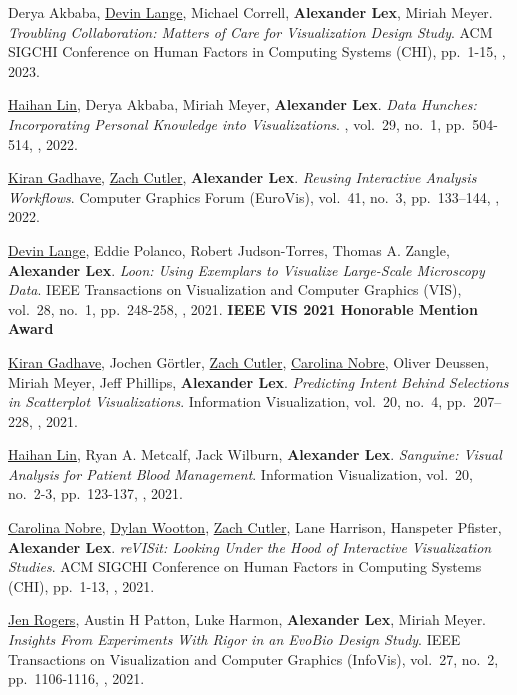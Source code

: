 \item Derya Akbaba, \uline{Devin Lange}, Michael Correll, \textbf{Alexander Lex}, Miriah Meyer. \textit{Troubling Collaboration: Matters of Care for Visualization Design Study}. ACM SIGCHI Conference on Human Factors in Computing Systems (CHI), pp.\ 1-15, , 2023. 
\item \uline{Haihan Lin}, Derya Akbaba, Miriah Meyer, \textbf{Alexander Lex}. \textit{Data Hunches: Incorporating Personal Knowledge into Visualizations}. , vol.\ 29, no.\ 1, pp.\ 504-514, , 2022. 
\item \uline{Kiran Gadhave}, \uline{Zach Cutler}, \textbf{Alexander Lex}. \textit{Reusing Interactive Analysis Workflows}. Computer Graphics Forum (EuroVis), vol.\ 41, no.\ 3, pp.\ 133--144, , 2022. 
\item \uline{Devin Lange}, Eddie Polanco, Robert Judson-Torres, Thomas A. Zangle, \textbf{Alexander Lex}. \textit{Loon: Using Exemplars to Visualize Large-Scale Microscopy Data}. IEEE Transactions on Visualization and Computer Graphics (VIS), vol.\ 28, no.\ 1, pp.\ 248-258, , 2021. \textbf{IEEE VIS 2021 Honorable Mention Award}
\item \uline{Kiran Gadhave}, Jochen Görtler, \uline{Zach Cutler}, \uline{Carolina Nobre}, Oliver Deussen, Miriah Meyer, Jeff Phillips, \textbf{Alexander Lex}. \textit{Predicting Intent Behind Selections in Scatterplot Visualizations}. Information Visualization, vol.\ 20, no.\ 4, pp.\ 207--228, , 2021. 
\item \uline{Haihan Lin}, Ryan A. Metcalf, Jack Wilburn, \textbf{Alexander Lex}. \textit{Sanguine: Visual Analysis for Patient Blood Management}. Information Visualization, vol.\ 20, no.\ 2-3, pp.\ 123-137, , 2021. 
\item \uline{Carolina Nobre}, \uline{Dylan Wootton}, \uline{Zach Cutler}, Lane Harrison, Hanspeter Pfister, \textbf{Alexander Lex}. \textit{reVISit: Looking Under the Hood of Interactive Visualization Studies}. ACM SIGCHI Conference on Human Factors in Computing Systems (CHI), pp.\ 1-13, , 2021. 
\item \uline{Jen Rogers}, Austin H Patton, Luke Harmon, \textbf{Alexander Lex}, Miriah Meyer. \textit{Insights From Experiments With Rigor in an EvoBio Design Study}. IEEE Transactions on Visualization and Computer Graphics (InfoVis), vol.\ 27, no.\ 2, pp.\ 1106-1116, , 2021. 
